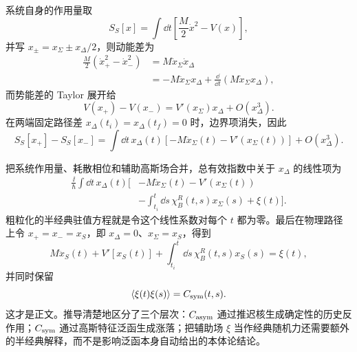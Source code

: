 \begin{derivation}[影响泛函中的随机力与因果反作用]
系统自身的作用量取
\begin{equation*}
 S_S[x]=\int\dd t\left[\frac{M}{2}\dot x^2-V(x)\right],
\end{equation*}
并写 $x_\pm=x_\Sigma\pm x_\Delta/2$，则动能差为
\begin{align*}
 \frac{M}{2}(\dot x_+^2-\dot x_-^2)
 &=M\dot x_\Sigma\dot x_\Delta\\
 &=-M\ddot x_\Sigma x_\Delta
 +\frac{\dd}{\dd t}(M\dot x_\Sigma x_\Delta),
\end{align*}
而势能差的 Taylor 展开给
\begin{equation*}
 V(x_+)-V(x_-)
 =V'(x_\Sigma)x_\Delta+O(x_\Delta^3).
\end{equation*}
在两端固定路径差 $x_\Delta(t_i)=x_\Delta(t_f)=0$ 时，边界项消失，因此
\begin{equation*}
 S_S[x_+]-S_S[x_-]
 =\int\dd t\,x_\Delta(t)
 [-M\ddot x_\Sigma(t)-V'(x_\Sigma(t))]
 +O(x_\Delta^3).
\end{equation*}

把系统作用量、耗散相位和辅助高斯场合并，总有效指数中关于 $x_\Delta$ 的线性项为
\begin{align*}
 \frac{\ii}{\hbar}\int\dd t\,x_\Delta(t)
 \Bigg[&-M\ddot x_\Sigma(t)-V'(x_\Sigma(t))\\
 &-\int_{t_i}^{t}\dd s\,\chi_B^R(t,s)x_\Sigma(s)
 +\xi(t)\Bigg].
\end{align*}
粗粒化的半经典驻值方程就是令这个线性系数对每个 $t$ 都为零。最后在物理路径上令 $x_+=x_-=x_S$，即 $x_\Delta=0$、$x_\Sigma=x_S$，得到
\begin{equation*}
 M\ddot x_S(t)+V'[x_S(t)]
 +\int_{t_i}^{t}\dd s\,\chi_B^R(t,s)x_S(s)
 =\xi(t),
\end{equation*}
并同时保留
\begin{equation*}
 \langle\xi(t)\xi(s)\rangle=C_{\rm sym}(t,s).
\end{equation*}
这才是正文。推导清楚地区分了三个层次：$C_{\rm asym}$ 通过推迟核生成确定性的历史反作用；$C_{\rm sym}$ 通过高斯特征泛函生成涨落；把辅助场 $\xi$ 当作经典随机力还需要额外的半经典解释，而不是影响泛函本身自动给出的本体论结论。
\end{derivation}







